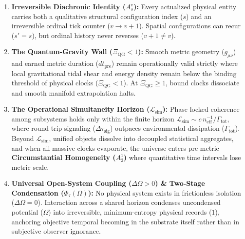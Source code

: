 \documentclass[
]{article}
\providecommand{\tightlist}{%
  \setlength{\itemsep}{0pt}\setlength{\parskip}{0pt}}
\begin{document}
\begin{enumerate}
\def\labelenumi{\arabic{enumi}.}
\tightlist
\item
  \textbf{Irreversible Diachronic Identity (\(A_s^v\)):} Every
  actualized physical entity carries both a qualitative structural
  configuration index (\(s\)) and an irreversible ordinal tick counter
  (\(v \to v + 1\)). Spatial configurations can recur (\(s' = s\)), but
  ordinal history never reverses (\(v + 1 \neq v\)).
\item
  \textbf{The Quantum-Gravity Wall (\(\Xi_{\mathrm{QG}} < 1\)):} Smooth
  metric geometry (\(g_{\mu\nu}\)) and earned metric duration
  (\(dt_{\mathrm{pre}}\)) remain operationally valid strictly where
  local gravitational tidal shear and energy density remain below the
  binding threshold of physical clocks (\(\Xi_{\mathrm{QG}} < 1\)). At
  \(\Xi_{\mathrm{QG}} \ge 1\), bound clocks dissociate and smooth
  manifold extrapolation halts.
\item
  \textbf{The Operational Simultaneity Horizon
  (\(\mathcal{L}_{\mathrm{sim}}\)):} Phase-locked coherence among
  subsystems holds only within the finite horizon
  \(\mathcal{L}_{\mathrm{sim}} \sim c\, n_{\mathrm{eff}}^{-1} / \Gamma_{\mathrm{tot}}\),
  where round-trip signaling (\(\Delta\tau_{\mathrm{sig}}\)) outpaces
  environmental dissipation (\(\Gamma_{\mathrm{tot}}\)). Beyond
  \(\mathcal{L}_{\mathrm{sim}}\), unified objects dissolve into
  decoupled statistical aggregates, and when all massive clocks
  evaporate, the universe enters pre-metric \textbf{Circumstantial
  Homogeneity (\(A_2^1\))} where quantitative time intervals lose metric
  scale.
\item
  \textbf{Universal Open-System Coupling (\(\Delta\Omega > 0\)) \&
  Two-Stage Condensation (\(\Phi_\tau(\Omega)\)):} No physical system
  exists in frictionless isolation (\(\Delta\Omega = 0\)). Interaction
  across a shared horizon condenses uncondensed potential (\(\Omega\))
  into irreversible, minimum-entropy physical records (\(1\)), anchoring
  objective temporal becoming in the substrate itself rather than in
  subjective observer ignorance.
\end{enumerate}
\end{document}
